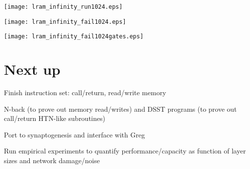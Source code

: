 \documentclass[pdftex,12pt,letterpaper]{article}
\begin{document}
\begin{sidewaysfigure}
\centering
\texttt{[image: lram\_infinity\_run1024.eps]}
\caption{A raster plot showing execution of the program in Table \ref{tbl:aas} when \texttt{TC} contains \texttt{null}.}
\end{sidewaysfigure}

\begin{sidewaysfigure}
\centering
\texttt{[image: lram\_infinity\_fail1024.eps]}
\caption{A raster plot showing failed execution of the program in Table \ref{tbl:aas} when \texttt{TC} contains \texttt{null}.  After a couple loop iterations the activity destabilizes.}
\label{fig:fail}
\end{sidewaysfigure}

\begin{sidewaysfigure}
\centering
\texttt{[image: lram\_infinity\_fail1024gates.eps]}
\caption{A close-up of the destabilized memory and gate activity from Fig.\@ \ref{fig:fail}.}
\end{sidewaysfigure}


\section{Next up}

\indent * Finish instruction set: call/return, read/write memory

\noindent * N-back (to prove out memory read/writes) and DSST programs (to prove out call/return HTN-like subroutines)

\noindent * Port to synaptogenesis and interface with Greg

\noindent * Run empirical experiments to quantify performance/capacity as function of layer sizes and network damage/noise
\end{document}
